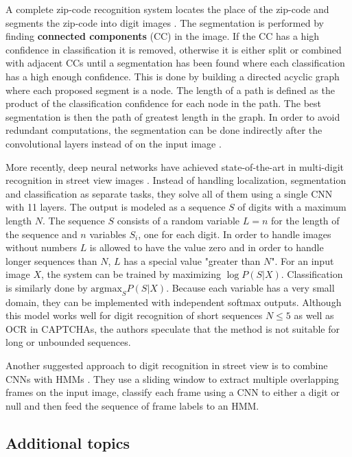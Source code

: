 A complete zip-code recognition system locates the place of the zip-code and segments the zip-code into digit images \cite{zipcode_system}. The segmentation is performed by finding \textbf{connected components} (CC) in the image. If the CC has a high confidence in classification it is removed, otherwise it is either split or combined with adjacent CCs until a segmentation has been found where each classification has a high enough confidence. This is done by building a directed acyclic graph where each proposed segment is a node. The length of a path is defined as the product of the classification confidence for each node in the path. The best segmentation is then the path of greatest length in the graph. In order to avoid redundant computations, the segmentation can be done indirectly after the convolutional layers instead of on the input image \cite{lecun_multidigit}.

More recently, deep neural networks have achieved state-of-the-art in multi-digit recognition in street view images \cite{multidigit_streetview}. Instead of handling localization, segmentation and classification as separate tasks, they solve all of them using a single CNN with 11 layers. The output is modeled as a sequence $S$ of digits with a maximum length $N$. The sequence $S$ consists of a random variable $L=n$ for the length of the sequence and $n$ variables $S_i$, one for each digit. In order to handle images without numbers $L$ is allowed to have the value zero and in order to handle longer sequences than $N$, $L$ has a special value "greater than $N$". For an input image $X$, the system can be trained by maximizing $\log P(S \vert X)$. Classification is similarly done by $\text{argmax}_S P(S \vert X)$.
Because each variable has a very small domain, they can be implemented with independent softmax outputs.
Although this model works well for digit recognition of short sequences $N \leq 5$ as well as OCR in CAPTCHAs, the authors speculate that the method is not suitable for long or unbounded sequences.

Another suggested approach to digit recognition in street view is to combine CNNs with HMMs \cite{multidigit_streetview_CNN_HMM}. They use a sliding window to extract multiple overlapping frames on the input image, classify each frame using a CNN to either a digit or null and then feed the sequence of frame labels to an HMM.



\subsection{Additional topics}

